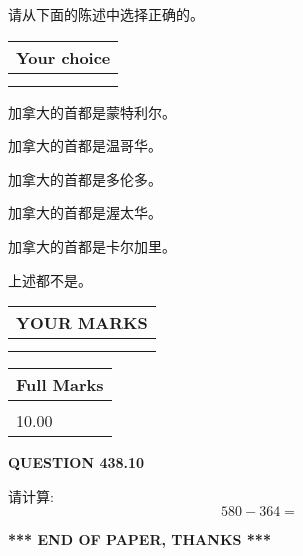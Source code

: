 \documentclass{ctexart}
\begin{document}
  
请从下面的陈述中选择正确的。
  
  
\noindent\hspace{3.0in} \begin{tabular}{|l|}
\hline
Your choice \\
\hline
 \\ 
 \\ 
\hline
\end{tabular}
  
  
 
 
加拿大的首都是蒙特利尔。
 
 
加拿大的首都是温哥华。
 
 
加拿大的首都是多伦多。
 
 
加拿大的首都是渥太华。
 
 
加拿大的首都是卡尔加里。
 
 
 上述都不是。
 
 
  
\vspace{0.2in}
  
\noindent\begin{tabular}{|l|}
\hline
 YOUR MARKS  \\
\hline
 \\ 
 \\ 
\hline
\end{tabular}
\hspace{0.05in} \begin{tabular}{|l|}
\hline
 Full Marks  \\
\hline
 \\ 
10.00 \\
\hline
\end{tabular}
{\textbf{\Large{QUESTION
438.10 
}}}
  
  
 
请计算:
\begin{equation}
580 -   %
364 = \nonumber
\end{equation}
 

 

 
   
   
 \vspace{0.2in}
 
   
   
   
   
\vspace{1.0in} 
{\textbf{\large{ *** END OF PAPER, THANKS *** }}} 
   
\end{document}
